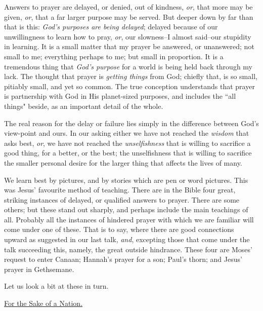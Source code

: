 Answers to prayer are delayed, or denied, out of kindness, \textit{or}, that more
may be given, \textit{or}, that a far larger purpose may be served. But deeper
down by far than that is this: \textit{God's purposes are being delayed}; delayed
because of our unwillingness to learn how to pray, \textit{or}, our slowness--I
almost said--our stupidity in learning. It is a small matter that my
prayer be answered, or unanswered; not small to me; everything perhaps to
me; but small in proportion. It is a tremendous thing that \textit{God's purpose}
for a world is being held back through my lack. The thought that prayer is
\textit{getting things} from God; chiefly that, is so small, pitiably small, and
yet so common. The true conception understands that prayer is partnership
with God in His planet-sized purposes, and includes the ``all things"
beside, as an important detail of the whole.

The real reason for the delay or failure lies simply in the difference
between God's view-point and ours. In our asking either we have not
reached the \textit{wisdom} that asks best, \textit{or}, we have not reached the
\textit{unselfishness} that is willing to sacrifice a good thing, for a better,
or the best; the unselfishness that is willing to sacrifice the smaller
personal desire for the larger thing that affects the lives of many.

We learn best by pictures, and by stories which are pen or word pictures.
This was Jesus' favourite method of teaching. There are in the Bible four
great, striking instances of delayed, or qualified answers to prayer.
There are some others; but these stand out sharply, and perhaps include
the main teachings of all. Probably all the instances of hindered prayer
with which we are familiar will come under one of these. That is to say,
where there are good connections upward as suggested in our last talk,
\textit{and}, excepting those that come under the talk succeeding this, namely,
the great outside hindrance. These four are Moses' request to enter
Canaan; Hannah's prayer for a son; Paul's thorn; and Jesus' prayer in
Gethsemane.

Let us look a bit at these in turn.



\underline{For the Sake of a Nation.}


